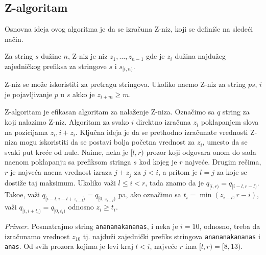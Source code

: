 \noindent
\begin{minipage}[l]{\textwidth}

\end{minipage}

\subsection{Z-algoritam}

Osnovna ideja ovog algoritma je da se izra\v cuna Z-niz, koji se defini\v se na slede\' ci na\v cin.

\begin{dfn}
Za string $s$ du\v zine $n$, Z-niz je niz $z_1, \ldots, z_{n-1}$ gde je $z_i$ du\v zina najdu\v zeg zajedni\v ckog prefiksa za stringove $s$ i $s_{[i, n)}$.
\end{dfn}

Z-niz se mo\v ze iskoristiti za pretragu stringova. Ukoliko na\dj emo Z-niz za string $ps$, $i$ je pojavljivanje $p$ u $s$ akko je $z_{i+m} \geq m$.

Z-algoritam je efikasan algoritam za nala\v zenje Z-niza.\cite{zalgoknjiga} Ozna\v cimo sa $q$ string za koji nalazimo Z-niz. Algoritam za svako $i$ direktno izra\v cuna $z_i$ poklapanjem slova na pozicijama $z_i, i + z_i$. Klju\v cna ideja je da se prethodno izra\v cunate vrednosti Z-niza mogu iskoristiti da se postavi bolja po\v cetna vrednost za $z_i$, umesto da se svaki put kre\' ce od nule. Naime, neka je $[l,r)$ prozor koji odgovara onom do sada na\dj enom poklapanju sa prefiksom stringa $s$ kod kojeg je $r$ najve\' ce. Drugim re\v cima, $r$ je najve\' ca na\dj ena vrednost izraza $j+z_j$ za $j<i$, a pritom je $l = j$ za koje se dosti\v ze taj maksimum. Ukoliko va\v zi $l \leq i < r$, tada znamo da je $q_{[i, r)} = q_{[i-l, r-l)}$. Tako\dj e, va\v zi $q_{[i-l, i-l+z_{i-l})} = q_{[0, z_{i-l})}$ pa, ako ozna\v cimo sa $t_i = \min(z_{i-l}, r-i)$, va\v zi $q_{[i, i+t_i)} = q_{[0, t_i)}$ odnosno $z_i \geq t_i$.

\noindent
\begin{minipage}[l]{\textwidth}

\end{minipage}

\textit{Primer.} Posmatrajmo string \texttt{anananakananas}, i neka je $i=10$, odnosno, treba da izra\v cunamo vrednost $z_{10}$ tj. najdu\v zi zajedni\v cki prefiks stringova \texttt{anananakananas} i \texttt{anas}. Od svih prozora kojima je levi kraj $l < i$, najve\' ce $r$ ima $[l,r) = [8,13)$.

